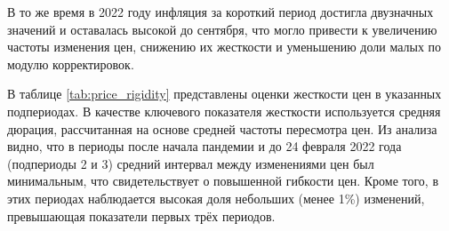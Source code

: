В то же время в 2022 году инфляция за короткий период достигла двузначных значений и оставалась высокой до сентября, что могло привести к увеличению частоты изменения цен, снижению их жесткости и уменьшению доли малых по модулю корректировок.  

В таблице \ref{tab:price_rigidity} представлены оценки жесткости цен в указанных подпериодах. В качестве ключевого показателя жесткости используется средняя дюрация, рассчитанная на основе средней частоты пересмотра цен. Из анализа видно, что в периоды после начала пандемии и до 24 февраля 2022 года (подпериоды 2 и 3) средний интервал между изменениями цен был минимальным, что свидетельствует о повышенной гибкости цен. Кроме того, в этих периодах наблюдается высокая доля небольших (менее 1\%) изменений, превышающая показатели первых трёх периодов.







